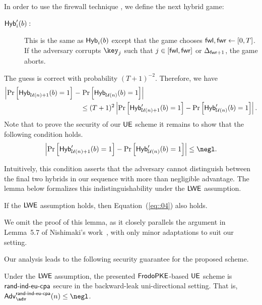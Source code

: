 \documentclass{fundam}
\begin{document}
In order to use the firewall technique \cite{jiang2020,nishimaki2022direction}, we define the next hybrid game:
\begin{description}
	\item[$\mathsf{Hyb}_{i}'(b):$] This is the same as $\mathsf{Hyb}_{i}(b)$ except that the game chooses $\mathsf{fwl},\mathsf{fwr}\gets [0,T]$. If the adversary corrupts $\key_{j}$ such that $j\in[\mathsf{fwl},\mathsf{fwr}]$ or $\Delta_{\mathsf{fwr}+1}$, the game aborts.
\end{description}
The guess is correct with probability $(T+1)^{-2}$. Therefore, we have
%
\begin{align*}
	\left|  \Pr\left[   \mathsf{Hyb}_{\mathcal{U}(n)+1}(b)=1\right]\right. - & \left. \Pr\left[   \mathsf{Hyb}_{\mathcal{U}(n)}(b)=1  \right]  \right| \\
	&\leq (T+1)^{2}	\left|  \Pr\left[   \mathsf{Hyb}_{\mathcal{U}(n)+1}'(b)=1\right] - \Pr\left[   \mathsf{Hyb}_{\mathcal{U}(n)}'(b)=1  \right]  \right|.
\end{align*}
%
Note that to prove the security of our $\mathsf{UE}$ scheme it remains to show that the following condition holds.  
\begin{align}\label{eq::04}
	\left|  \Pr\left[   \tx{Hyb}_{\mathcal{U}(n)+1}'(b)=1\right] - \Pr\left[   \tx{Hyb}_{\mathcal{U}(n)}'(b)=1  \right]  \right|\leq \negl.
\end{align}

\noindent
Intuitively, this condition asserts that the adversary cannot distinguish between the final two hybrids in our sequence with more than negligible advantage. The lemma below formalizes this indistinguishability under the $\mathsf{LWE}$ assumption.
\begin{lemma}
	If the $\mathsf{LWE}$ assumption holds, then Equation~(\ref{eq::04}) also holds.
\end{lemma}

\noindent
We omit the proof of this lemma, as it closely parallels the argument in Lemma~5.7 of Nishimaki’s work~\cite{nishimaki2022direction}, with only minor adaptations to suit our setting.


\vspace{0.5cm}
Our analysis leads to the following security guarantee for the proposed scheme.
\begin{theorem}\label{th::main::one}
	Under the $\mathsf{LWE}$ assumption, the presented $\mathsf{FrodoPKE}$-based $\mathsf{UE}$ scheme is $\mathsf{rand{\text{-}} ind{\text{-}} eu{\text{-}} cpa}$	secure in the backward-leak uni-directional setting. That is, $\Adv_{\adv}^{\EUS}(n) \leq \negl$. 
\end{theorem}	
\end{document}
